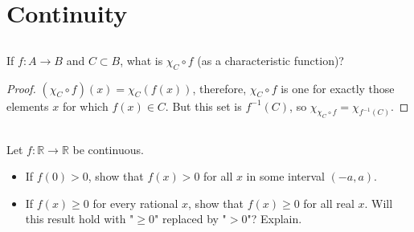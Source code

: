 \section{Continuity}


\subsection{} If $f :  A \rightarrow B$ and $C \subset B$, what is $\chi_C \circ f$ (as a characteristic function)?

\begin{proof}
$(\chi_C \circ f)(x) = \chi_C(f(x))$, therefore, $\chi_C \circ f$ is one for exactly those elements $x$ for which $f(x) \in C$. But this set is $f^{-1}(C)$, so $\chi_{\chi_C \circ f} = \chi_{f^{-1}(C)}$.

\end{proof}



\subsection{} Let $f: \mathbb{R} \rightarrow \mathbb{R}$ be continuous.
\begin{itemize}
    \item If $f(0) > 0$, show that $f(x) > 0$ for all $x$ in some interval $(-a, a)$.
    \item If $f(x) \geq 0$ for every rational $x$, show that $f(x) \geq 0$ for all real $x$. Will this result hold with "$\geq0$" replaced by "$>0$"? Explain. 
\end{itemize}


